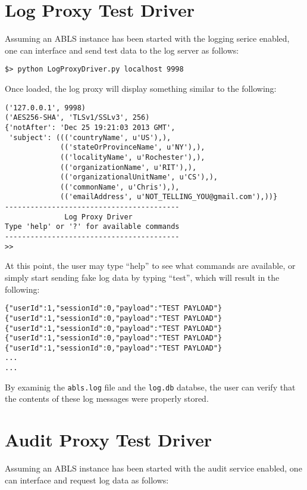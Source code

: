 \section{Log Proxy Test Driver}
Assuming an ABLS instance has been started with the logging serice enabled, one can interface and send test data
to the log server as follows:

\begin{lstlisting}
$> python LogProxyDriver.py localhost 9998
\end{lstlisting}

Once loaded, the log proxy will display something similar to the following:

\begin{lstlisting}
('127.0.0.1', 9998)
('AES256-SHA', 'TLSv1/SSLv3', 256)
{'notAfter': 'Dec 25 19:21:03 2013 GMT',
 'subject': ((('countryName', u'US'),),
             (('stateOrProvinceName', u'NY'),),
             (('localityName', u'Rochester'),),
             (('organizationName', u'RIT'),),
             (('organizationalUnitName', u'CS'),),
             (('commonName', u'Chris'),),
             (('emailAddress', u'NOT_TELLING_YOU@gmail.com'),))}
-----------------------------------------
              Log Proxy Driver           
Type 'help' or '?' for available commands
-----------------------------------------
>> 
\end{lstlisting}

At this point, the user may type ``help'' to see what commands are available, or simply start sending fake
log data by typing ``test'', which will result in the following:

\begin{lstlisting}
{"userId":1,"sessionId":0,"payload":"TEST PAYLOAD"}
{"userId":1,"sessionId":0,"payload":"TEST PAYLOAD"}
{"userId":1,"sessionId":0,"payload":"TEST PAYLOAD"}
{"userId":1,"sessionId":0,"payload":"TEST PAYLOAD"}
{"userId":1,"sessionId":0,"payload":"TEST PAYLOAD"}
...
...
\end{lstlisting}

By examinig the {\tt abls.log} file and the {\tt log.db} databse, the user can verify that the contents of these
log messages were properly stored.

\section{Audit Proxy Test Driver}
Assuming an ABLS instance has been started with the audit service enabled, one can interface and request log data
as follows:

